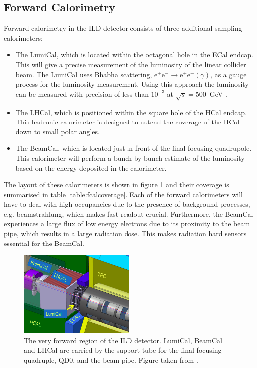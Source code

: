 
\subsection{Forward Calorimetry}
Forward calorimetry in the ILD detector consists of three additional sampling calorimeters:
\begin{itemize}
\item The LumiCal, which is located within the octagonal hole in the ECal endcap.  This will give a precise measurement of the luminosity of the linear collider beam.   The LumiCal uses Bhabha scattering, $\text{e}^{+}\text{e}^{-} \rightarrow \text{e}^{+}\text{e}^{-}(\gamma)$, as a gauge process for the luminosity measurement.  Using this approach the luminosity can be measured with precision of less than $10^{-3}$ at $\sqrt{s}=500$~GeV \cite{arXiv:1006.3396}. 
\item The LHCal, which is positioned within the square hole of the HCal endcap.  This hadronic calorimeter is designed to extend the coverage of the HCal down to small polar angles.  
\item The BeamCal, which is located just in front of the final focusing quadrupole.  This calorimeter will perform a bunch-by-bunch estimate of the luminosity based on the energy deposited in the calorimeter.
\end{itemize}
The layout of these calorimeters is shown in figure \ref{fig:fcal} and their coverage is summarised in table \ref{table:fcalcoverage}.  Each of the forward calorimeters will have to deal with high occupancies due to the presence of background processes, e.g. beamstrahlung, which makes fast readout crucial.  Furthermore, the BeamCal experiences a large flux of low energy electrons due to its proximity to the beam pipe, which results in a large radiation dose.  This makes radiation hard sensors essential for the BeamCal.  

\begin{figure}[h!]
\centering
\includegraphics[width=0.5\textwidth]{LCDetectorsAndPFlow/Plots/Pictures/FCal.png}
\caption[The very forward region of the ILD detector.  LumiCal, BeamCal and LHCal are carried by the support tube for the final focusing quadruple, QD0, and the beam pipe.  Figure taken from  \cite{Behnke:2013lya}.]{The very forward region of the ILD detector.  LumiCal, BeamCal and LHCal are carried by the support tube for the final focusing quadruple, QD0, and the beam pipe.  Figure taken from  \cite{Behnke:2013lya}.}
\label{fig:fcal}
\end{figure} 


